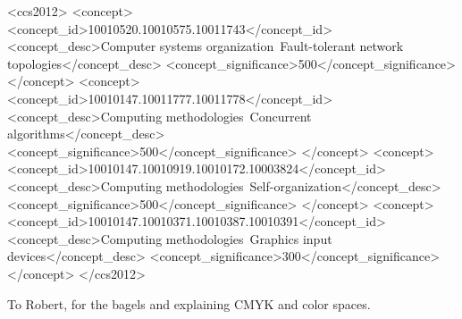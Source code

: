 \documentclass[manuscript,screen,review]{acmart}
\begin{document}
\begin{CCSXML}
<ccs2012>
   <concept>
       <concept_id>10010520.10010575.10011743</concept_id>
       <concept_desc>Computer systems organization~Fault-tolerant network topologies</concept_desc>
       <concept_significance>500</concept_significance>
       </concept>
   <concept>
       <concept_id>10010147.10011777.10011778</concept_id>
       <concept_desc>Computing methodologies~Concurrent algorithms</concept_desc>
       <concept_significance>500</concept_significance>
       </concept>
   <concept>
       <concept_id>10010147.10010919.10010172.10003824</concept_id>
       <concept_desc>Computing methodologies~Self-organization</concept_desc>
       <concept_significance>500</concept_significance>
       </concept>
   <concept>
       <concept_id>10010147.10010371.10010387.10010391</concept_id>
       <concept_desc>Computing methodologies~Graphics input devices</concept_desc>
       <concept_significance>300</concept_significance>
       </concept>
 </ccs2012>
\end{CCSXML}




\maketitle







\begin{acks}
To Robert, for the bagels and explaining CMYK and color spaces.
\end{acks}
\end{document}
